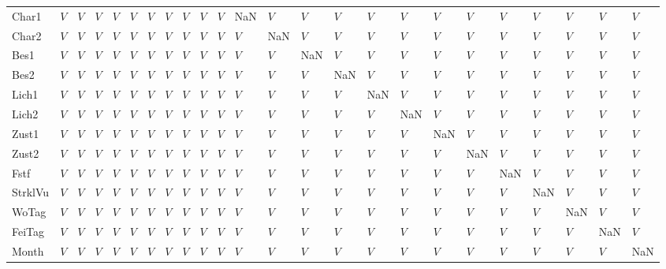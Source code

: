 \begin{tabular}{llllllllllllllllllllllll}
Char1   &     $V$ &  $V$ &  $V$ &   $V$ &   $V$ &   $V$ &   $V$ &   $V$ &   $V$ &   $V$ &   NaN &   $V$ &  $V$ &  $V$ &   $V$ &   $V$ &   $V$ &   $V$ &  $V$ &     $V$ &   $V$ &    $V$ &   $V$ \\
Char2   &     $V$ &  $V$ &  $V$ &   $V$ &   $V$ &   $V$ &   $V$ &   $V$ &   $V$ &   $V$ &   $V$ &   NaN &  $V$ &  $V$ &   $V$ &   $V$ &   $V$ &   $V$ &  $V$ &     $V$ &   $V$ &    $V$ &   $V$ \\
Bes1    &     $V$ &  $V$ &  $V$ &   $V$ &   $V$ &   $V$ &   $V$ &   $V$ &   $V$ &   $V$ &   $V$ &   $V$ &  NaN &  $V$ &   $V$ &   $V$ &   $V$ &   $V$ &  $V$ &     $V$ &   $V$ &    $V$ &   $V$ \\
Bes2    &     $V$ &  $V$ &  $V$ &   $V$ &   $V$ &   $V$ &   $V$ &   $V$ &   $V$ &   $V$ &   $V$ &   $V$ &  $V$ &  NaN &   $V$ &   $V$ &   $V$ &   $V$ &  $V$ &     $V$ &   $V$ &    $V$ &   $V$ \\
Lich1   &     $V$ &  $V$ &  $V$ &   $V$ &   $V$ &   $V$ &   $V$ &   $V$ &   $V$ &   $V$ &   $V$ &   $V$ &  $V$ &  $V$ &   NaN &   $V$ &   $V$ &   $V$ &  $V$ &     $V$ &   $V$ &    $V$ &   $V$ \\
Lich2   &     $V$ &  $V$ &  $V$ &   $V$ &   $V$ &   $V$ &   $V$ &   $V$ &   $V$ &   $V$ &   $V$ &   $V$ &  $V$ &  $V$ &   $V$ &   NaN &   $V$ &   $V$ &  $V$ &     $V$ &   $V$ &    $V$ &   $V$ \\
Zust1   &     $V$ &  $V$ &  $V$ &   $V$ &   $V$ &   $V$ &   $V$ &   $V$ &   $V$ &   $V$ &   $V$ &   $V$ &  $V$ &  $V$ &   $V$ &   $V$ &   NaN &   $V$ &  $V$ &     $V$ &   $V$ &    $V$ &   $V$ \\
Zust2   &     $V$ &  $V$ &  $V$ &   $V$ &   $V$ &   $V$ &   $V$ &   $V$ &   $V$ &   $V$ &   $V$ &   $V$ &  $V$ &  $V$ &   $V$ &   $V$ &   $V$ &   NaN &  $V$ &     $V$ &   $V$ &    $V$ &   $V$ \\
Fstf    &     $V$ &  $V$ &  $V$ &   $V$ &   $V$ &   $V$ &   $V$ &   $V$ &   $V$ &   $V$ &   $V$ &   $V$ &  $V$ &  $V$ &   $V$ &   $V$ &   $V$ &   $V$ &  NaN &     $V$ &   $V$ &    $V$ &   $V$ \\
StrklVu &     $V$ &  $V$ &  $V$ &   $V$ &   $V$ &   $V$ &   $V$ &   $V$ &   $V$ &   $V$ &   $V$ &   $V$ &  $V$ &  $V$ &   $V$ &   $V$ &   $V$ &   $V$ &  $V$ &     NaN &   $V$ &    $V$ &   $V$ \\
WoTag   &     $V$ &  $V$ &  $V$ &   $V$ &   $V$ &   $V$ &   $V$ &   $V$ &   $V$ &   $V$ &   $V$ &   $V$ &  $V$ &  $V$ &   $V$ &   $V$ &   $V$ &   $V$ &  $V$ &     $V$ &   NaN &    $V$ &   $V$ \\
FeiTag  &     $V$ &  $V$ &  $V$ &   $V$ &   $V$ &   $V$ &   $V$ &   $V$ &   $V$ &   $V$ &   $V$ &   $V$ &  $V$ &  $V$ &   $V$ &   $V$ &   $V$ &   $V$ &  $V$ &     $V$ &   $V$ &    NaN &   $V$ \\
Month   &     $V$ &  $V$ &  $V$ &   $V$ &   $V$ &   $V$ &   $V$ &   $V$ &   $V$ &   $V$ &   $V$ &   $V$ &  $V$ &  $V$ &   $V$ &   $V$ &   $V$ &   $V$ &  $V$ &     $V$ &   $V$ &    $V$ &   NaN \\
\bottomrule
\end{tabular}

